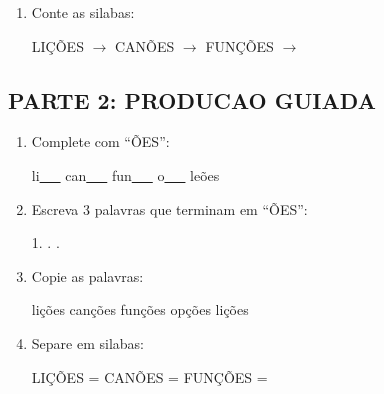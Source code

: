 \begin{exercicio}
\begin{enumerate}
  \item Conte as silabas:
  \begin{center}
  LIÇÕES $\rightarrow$ \underline{\hspace{1cm}} \quad CANÕES $\rightarrow$ \underline{\hspace{1cm}} \quad FUNÇÕES $\rightarrow$ \underline{\hspace{1cm}}
  \end{center}
\end{enumerate}

\subsection*{PARTE 2: PRODUCAO GUIADA}

\begin{enumerate}[resume]
  \item Complete com ``ÕES'':
  \begin{center}
  li\underline{~~~} \quad can\underline{~~~} \quad fun\underline{~~~} \quad o\underline{~~~} \quad le\~{o}es \underline{\hspace{0.5cm}}
  \end{center}

  \item Escreva 3 palavras que terminam em ``ÕES'':
  \begin{center}
  1. \underline{\hspace{3cm}} . \underline{\hspace{3cm}} . \underline{\hspace{3cm}}
  \end{center}

  \item Copie as palavras:
  \begin{center}
  lições \quad canções \quad funções \quad opções \quad lições
  \end{center}

  \item Separe em silabas:
  \begin{center}
  LIÇÕES = \underline{\hspace{1cm}} \underline{\hspace{1cm}} \underline{\hspace{1cm}} \quad CANÕES = \underline{\hspace{1cm}} \underline{\hspace{1cm}} \underline{\hspace{1cm}} \quad FUNÇÕES = \underline{\hspace{1cm}} \underline{\hspace{1cm}} \underline{\hspace{1cm}}
  \end{center}


\end{enumerate}
\end{exercicio}
